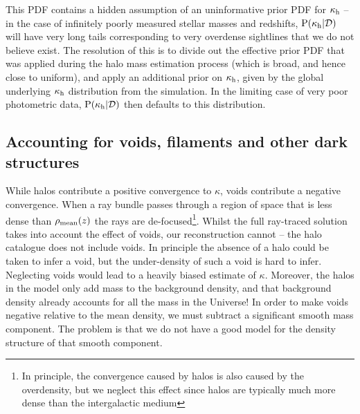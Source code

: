 \documentclass[useAMS,usenatbib]{mn2e}
\begin{document}
This PDF contains a hidden assumption of an uninformative prior PDF for
$\kappa_{\rm h}$ -- in the case of infinitely poorly measured stellar masses and
redshifts, ${\rm P}(\kappa_{\rm h}|{\mathcal{D}})$ will have very long tails corresponding to
very overdense sightlines that we do not believe exist. The resolution of this
is to divide out the effective prior PDF that was applied during the halo mass
estimation process (which is broad, and hence close to uniform), and apply an
additional prior on $\kappa_{\rm h}$, given by the global underlying $\kappa_{\rm h}$
distribution from the simulation. In the limiting  case of very poor
photometric data, ${\rm P}(\kappa_{\rm h}|{\mathcal{D}})$ then defaults to this distribution.





\subsection{Accounting for voids, filaments and other dark structures}
\label{sec:model:voids}

While halos contribute a positive convergence to $\kappa$, voids contribute
a negative convergence. When a ray bundle passes through a  region of space
that is less dense than $\rho_{\rm mean}(z)$ the rays are de-focused\footnote{In
principle, the convergence caused by halos is also caused by the overdensity,
but we neglect this effect since halos are typically much more dense than the
intergalactic medium}. Whilst the  full ray-traced solution takes into account
the effect of voids, our reconstruction cannot -- the halo catalogue does not
include voids. In principle the absence of a halo could be taken to infer a
void, but the under-density of such a void is hard to infer. Neglecting voids
would lead to a heavily biased estimate of $\kappa$. Moreover, the halos in 
the model only add mass to the background density, and that background density
already accounts for all the mass in the Universe! In order to make voids
negative relative to the mean density, we must subtract a significant smooth
mass component. The problem is that we do not have a good model for the
density structure of that smooth component. 
\end{document}
